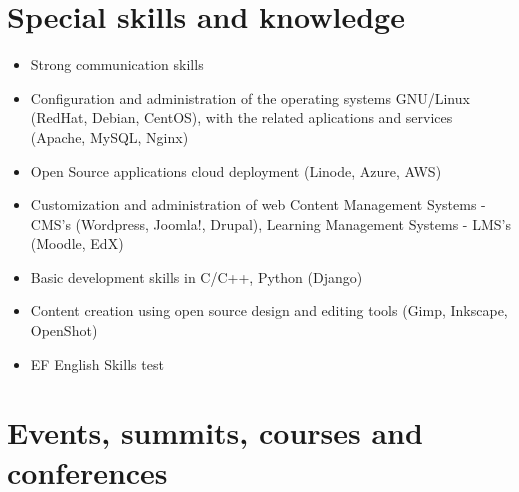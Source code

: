 \documentclass[overlapped,line,final]{res}
\begin{document}
\begin{resume}
\section{\sc Special skills and knowledge}
\vspace{0.5cm}
\begin{itemize}
	\item Strong communication skills 
	\item Configuration and administration of the operating systems GNU/Linux (RedHat, Debian, CentOS), with the related aplications and services (Apache, MySQL, Nginx)
	\item Open Source applications cloud deployment (Linode, Azure, AWS) 
	\item Customization and administration of web Content Management Systems - CMS's (Wordpress, Joomla!, Drupal), Learning Management Systems - LMS's (Moodle, EdX)
	\item Basic development skills in C/C++, Python (Django)
 	\item Content creation using open source design and editing tools (Gimp, Inkscape, OpenShot)
	\item EF English Skills test \href{https://raw.githubusercontent.com/Open-SAI/NemqCV/master/latex/docs/efTest.pdf}{}
\end{itemize}

\section{\sc Events, summits, courses and conferences}
\vspace{0.5cm}
\begin{itemize}


\end{itemize}
\end{resume}
\end{document}
